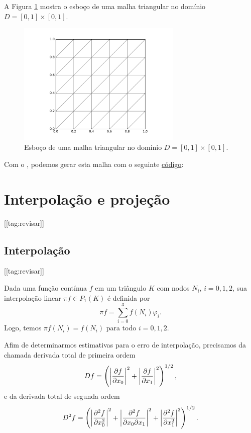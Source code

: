 \begin{ex}\label{ex:malha}
  A Figura \ref{fig:ex_malha} mostra o esboço de uma malha triangular no domínio $D = [0, 1]\times [0, 1]$.

  \begin{figure}[h!]
    \centering
    \includegraphics[width=0.7\textwidth]{./cap_mef2d/dados/ex_malha/fig_ex_malha}
    \caption{Esboço de uma malha triangular no domínio $D = [0, 1]\times [0, 1]$.}
    \label{fig:ex_malha}
  \end{figure}

\ifispython
Com o \fenics, podemos gerar esta malha com o seguinte \href{https://github.com/phkonzen/notas/blob/master/src/MetodoElementosFinitos/cap_mef2d/dados/ex_malha/ex_malha.py}{código}:

\fi
\end{ex}

\section{Interpolação e projeção}\label{cap_mef2d_sec_interp}
[[tag:revisar]]


\subsection{Interpolação}
[[tag:revisar]]


Dada uma função contínua $f$ em um triângulo $K$ com nodos $N_i$, $i=0, 1, 2$, sua interpolação linear $\pi f \in P_1(K)$ é definida por
\begin{equation}
  \pi f = \sum_{i=0}^3 f(N_i)\varphi_i.
\end{equation}
Logo, temos $\pi f(N_i) = f(N_i)$ para todo $i=0, 1, 2$.

Afim de determinarmos estimativas para o erro de interpolação, precisamos da chamada derivada total de primeira ordem
\begin{equation}
  Df = \left(\left|\frac{\partial f}{\partial x_0}\right|^2 + \left|\frac{\partial f}{\partial x_1}\right|^2\right)^{1/2},
\end{equation}
e da derivada total de segunda ordem
\begin{equation}
  D^2f = \left(\left|\frac{\partial^2 f}{\partial x_0^2}\right|^2 + \left|\frac{\partial^2 f}{\partial x_0\partial x_1}\right|^2 + \left|\frac{\partial^2 f}{\partial x_1^2}\right|^2\right)^{1/2}.
\end{equation}

